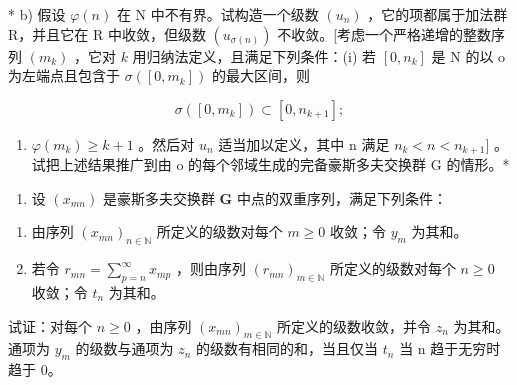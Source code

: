 * b) 假设 \(\varphi(n)\) 在 N 中不有界。试构造一个级数 \((u_n)\) ，它的项都属于加法群 R，并且它在 R 中收敛，但级数 \((u_{\sigma(n)})\) 不收敛。{[}考虑一个严格递增的整数序列 \((m_k)\) ，它对 \(k\) 用归纳法定义，且满足下列条件：(i) 若 \([0, n_k]\) 是 N 的以 o 为左端点且包含于 \(\sigma([0, m_k])\) 的最大区间，则

\[
\sigma ([ 0, m _ {k} ]) \subset [ 0, n _ {k + 1} ];
\]

\begin{enumerate}
\def\labelenumi{(\roman{enumi})}
\setcounter{enumi}{1}
\tightlist
\item
  \(\varphi(m_k) \geqslant k + 1\) 。然后对 \(u_n\) 适当加以定义，其中 n 满足 \(n_k < n < n_{k+1}]\) 。试把上述结果推广到由 o 的每个邻域生成的完备豪斯多夫交换群 G 的情形。*
\end{enumerate}

\begin{enumerate}
\def\labelenumi{\arabic{enumi})}
\setcounter{enumi}{6}
\tightlist
\item
  设 \((x_{mn})\) 是豪斯多夫交换群 \(\mathbf{G}\) 中点的双重序列，满足下列条件：
\end{enumerate}

\begin{enumerate}
\def\labelenumi{(\alph{enumi})}
\item
  由序列 \((x_{mn})_{n\in \mathbb{N}}\) 所定义的级数对每个 \(m\geqslant 0\) 收敛；令 \(y_{m}\) 为其和。
\item
  若令 \(r_{mn} = \sum_{p=n}^{\infty} x_{mp}\) ，则由序列 \((r_{mn})_{m \in \mathbb{N}}\) 所定义的级数对每个 \(n \geqslant 0\) 收敛；令 \(t_n\) 为其和。
\end{enumerate}

试证：对每个 \(n \geqslant 0\) ，由序列 \((x_{mn})_{m \in \mathbb{N}}\) 所定义的级数收敛，并令 \(z_{n}\) 为其和。通项为 \(y_{m}\) 的级数与通项为 \(z_{n}\) 的级数有相同的和，当且仅当 \(t_{n}\) 当 n 趋于无穷时趋于 0。

